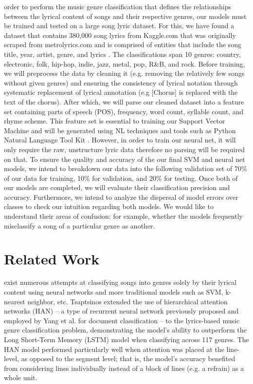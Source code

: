\documentclass[journal]{IEEEtran}
\begin{document}
     order to perform the music genre classification that defines the relationships between the lyrical content of songs and their respective genres, our models must be trained and tested on a large song lyric dataset. For this, we have found a dataset that contains 380,000 song lyrics from Kaggle.com that was originally scraped from metrolyrics.com and is comprised of entities that include the song title, year, artist, genre, and lyrics  \cite{KaggleDataset}. The classifications span 10 genres: country, electronic, folk, hip-hop, indie, jazz, metal, pop, R\&B, and rock. Before training, we will preprocess the data by cleaning it (e.g. removing the relatively few songs without given genres) and ensuring the consistency of lyrical notation through systematic replacement of lyrical annotation (e.g [Chorus] is replaced with the text of the chorus). After which, we will parse our cleaned dataset into a feature set containing parts of speech (POS), frequency, word count, syllable count, and rhyme scheme. This feature set is essential to training our Support Vector Machine and will be generated using NL techniques and tools such as Python Natural Language Tool Kit \cite{NLTK}. However, in order to train our neural net, it will only require the raw, unstructure lyric data therefore no parsing will be required on that. To ensure the quality and accuracy of the our final SVM and neural net models, we intend to breakdown our data into the following validation set of 70\% of our data for training, 10\% for validation, and 20\% for testing. Once both of our models are completed, we will evaluate their classification precision and accuracy. Furthermore, we intend to analyze the dispersal of model errors over classes to check our intuition regarding both models. We would like to understand their areas of confusion: for example, whether the models frequently misclassify a song of a particular genre as another. \par 



\section{Related Work}

 exist numerous attempts at classifying songs into genres solely by their lyrical content using neural networks and more traditional models such as SVM, k-nearest neighbor, etc. 
Tsaptsinos \cite{tsaptsinos} extended the use of hierarchical attention networks (HAN) -- a type of recurrent neural network previously proposed and employed by Yang et al. \cite{Yang} for document classification -- to the lyrics-based music genre classification problem, demonstrating the model's ability to outperform the Long Short-Term Memory (LSTM) model when classifying across 117 genres. The HAN model performed particularly well when attention was placed at the line-level, as opposed to the segment level; that is, the model's accuracy benefited from considering lines individually instead of a block of lines (e.g. a refrain) as a whole unit. \par
\end{document}
